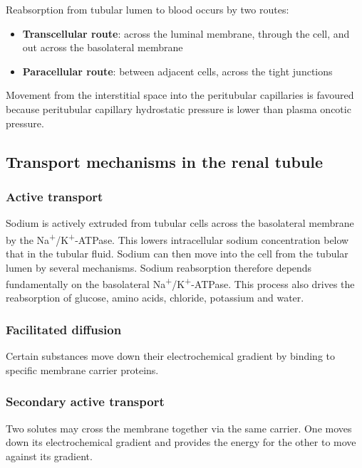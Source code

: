 \documentclass[11pt,a4paper]{article}
\begin{document}
Reabsorption from tubular lumen to blood occurs by two routes:
\begin{itemize}
    \item \textbf{Transcellular route}: across the luminal membrane, through the cell, and out across the basolateral membrane
    \item \textbf{Paracellular route}: between adjacent cells, across the tight junctions
\end{itemize}

Movement from the interstitial space into the peritubular capillaries is favoured because peritubular capillary hydrostatic pressure is lower than plasma oncotic pressure.

\subsection{Transport mechanisms in the renal tubule}

\subsubsection{Active transport}

Sodium is actively extruded from tubular cells across the basolateral membrane by the Na\textsuperscript{+}/K\textsuperscript{+}-ATPase. This lowers intracellular sodium concentration below that in the tubular fluid. Sodium can then move into the cell from the tubular lumen by several mechanisms. Sodium reabsorption therefore depends fundamentally on the basolateral Na\textsuperscript{+}/K\textsuperscript{+}-ATPase. This process also drives the reabsorption of glucose, amino acids, chloride, potassium and water.

\subsubsection{Facilitated diffusion}

Certain substances move down their electrochemical gradient by binding to specific membrane carrier proteins.

\subsubsection{Secondary active transport}

Two solutes may cross the membrane together via the same carrier. One moves down its electrochemical gradient and provides the energy for the other to move against its gradient.
\end{document}
